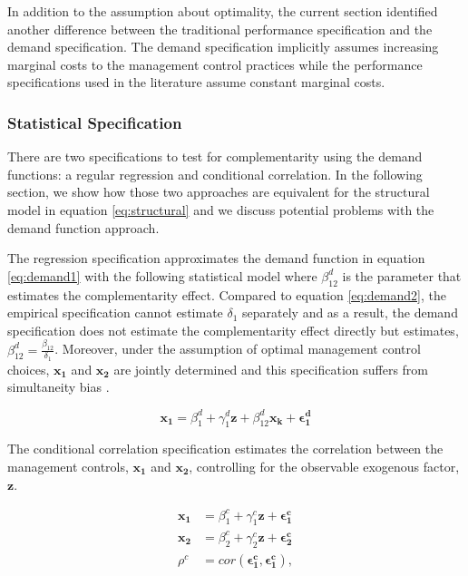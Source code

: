 \documentclass[12pt]{article}
\begin{document}
In addition to the assumption about optimality, the current section
identified another difference between the traditional performance
specification and the demand specification. The demand specification
implicitly assumes increasing marginal costs to the management control
practices while the performance specifications used in the literature
assume constant marginal costs.

\subsubsection{Statistical
Specification}\label{statistical-specification}

There are two specifications to test for complementarity using the
demand functions: a regular regression and conditional correlation. In
the following section, we show how those two approaches are equivalent
for the structural model in equation \eqref{eq:structural} and we
discuss potential problems with the demand function approach.

The regression specification approximates the demand function in
equation \eqref{eq:demand1} with the following statistical model where
\(\beta^d_{12}\) is the parameter that estimates the complementarity
effect. Compared to equation \eqref{eq:demand2}, the empirical
specification cannot estimate \(\delta_1\) separately and as a result,
the demand specification does not estimate the complementarity effect
directly but estimates, \(\beta^d_{12} = \frac{\beta_{12}}{\delta_1}\).
Moreover, under the assumption of optimal management control choices,
\(\mathbf{x_1}\) and \(\mathbf{x_2}\) are jointly determined and this
specification suffers from simultaneity bias \citep{Chenhall2007}.

\[
\mathbf{x_1} = \beta_1^d + \gamma_1^d \mathbf{z} + \beta_{12}^d \mathbf{x_k}
  + \mathbf{\epsilon^d_1}
\]

The conditional correlation specification estimates the correlation
between the management controls, \(\mathbf{x_1}\) and \(\mathbf{x_2}\),
controlling for the observable exogenous factor, \(\mathbf{z}\).

\begin{align*}
\mathbf{x_1} &= \beta_1^c + \gamma_1^c \mathbf{z} + \mathbf{\epsilon^c_1} \\
\mathbf{x_2} &= \beta_2^c + \gamma_2^c \mathbf{z} + \mathbf{\epsilon^c_2} \\
\rho^c &= cor(\mathbf{\epsilon^c_1}, \mathbf{\epsilon^c_1}),
\end{align*}
\end{document}
